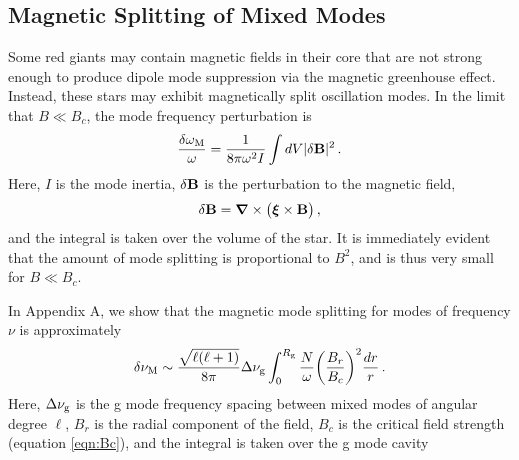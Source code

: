 \subsection{Magnetic Splitting of Mixed Modes}

Some red giants may contain magnetic fields in their core that are not strong enough to produce dipole mode suppression via the magnetic greenhouse effect. Instead, these stars may exhibit magnetically split oscillation modes. In the limit that $B \ll B_c$, the mode frequency perturbation is \citep{Unno_1989}
\begin{equation}
\label{eqn:dommag}
\frac{\delta \omega_{\rm M}}{\omega} = \frac{1}{8 \pi \omega^2 I} \int d V | \delta {\bf B} |^2 \, .
\end{equation}
Here, $I$ is the mode inertia,  $\delta {\bf B}$ is the perturbation to the magnetic field,
\begin{equation}
\label{eqn:dB}
\delta {\bf B} = {\boldsymbol \nabla} \times \big( {\boldsymbol \xi} \times {\bf B} \big) \, ,
\end{equation}
and the integral is taken over the volume of the star. It is immediately evident that the amount of mode splitting is proportional to $B^2$, and is thus very small for $B \ll B_c$.

In Appendix A, we show that the magnetic mode splitting for modes of frequency $\nu$ is approximately
\begin{equation}
\label{eqn:dfmag}
\delta \nu_{\rm M} \sim \frac{\sqrt{\ell(\ell+1)}}{8 \pi} \Delta \nu_{\rm g} \int^{R_{\rm g}}_0 \frac{N}{\omega} \bigg(\frac{B_r}{B_c}\bigg)^2 \frac{dr}{r} \, .
\end{equation}
Here, $\Delta \nu_{\rm g}$ is the g mode frequency spacing between mixed modes of angular degree $\ell$, $B_r$ is the radial component of the field, $B_c$ is the critical field strength (equation \ref{eqn:Bc}), and the integral is taken over the g mode cavity

